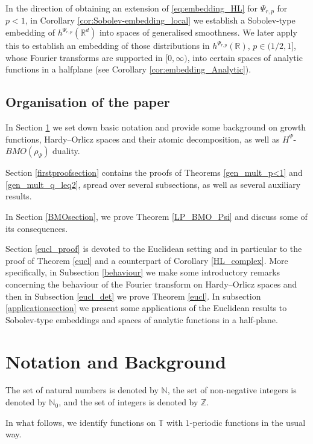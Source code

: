 \documentclass[a4paper, leqno, 10pt]{amsart}
\numberwithin{equation}{section}
\newcommand{\T}{\mathbb{T}}
\newcommand{\R}{\mathbb{R}}
\newcommand{\Z}{\mathbb{Z}}
\newcommand{\N}{\mathbb{N}}
\begin{document}
In the direction of obtaining an extension of \eqref{eq:embedding_HL} for $\Psi_{r,p}$ for $p<1$, in Corollary \ref{cor:Sobolev-embedding_local} we establish a Sobolev-type embedding of $h^{\Psi_{r,p}}(\R^d)$ into spaces of generalised smoothness. We later apply this to establish an embedding of those distributions in $h^{\Psi_{r,p}}(\R)$, $p \in (1/2, 1]$, whose Fourier transforms are supported in $[0,\infty)$, into certain spaces of analytic functions in a halfplane (see Corollary \ref{cor:embedding_Analytic}). 
%

%
\subsection*{Organisation of the paper} 

In Section \ref{background} we set down basic notation and provide some background on growth functions, Hardy--Orlicz spaces and their atomic decomposition, as well as $H^{\Psi}$-$BMO(\rho_{\Psi})$ duality. 

Section \ref{firstproofsection} contains the proofs of Theorems \ref{gen_mult_p<1} and \ref{gen_mult_q_leq2}, spread over several subsections, as well as several auxiliary results.

In Section \ref{BMOsection}, we prove Theorem \ref{LP_BMO_Psi} and discuss some of its consequences.
%

Section \ref{eucl_proof} is devoted to the Euclidean setting and in particular to the proof of Theorem \ref{eucl} and a counterpart of Corollary \ref{HL_complex}. More specifically, in Subsection \ref{behaviour} we make some introductory remarks concerning the behaviour of the Fourier transform on Hardy--Orlicz spaces and then in Subsection \ref{eucl_det} we prove Theorem \ref{eucl}. In subsection \ref{applicationsection} we present some applications of the Euclidean results to Sobolev-type embeddings and spaces of analytic functions in a half-plane. 
 
%

\section{Notation and Background}\label{background}

The set of natural numbers is denoted by $\N$, the set of non-negative integers is denoted by $\N_0$, and the set of integers is denoted by $\Z$. 

%

In what follows, we identify functions on $\T$ with $1$-periodic functions in the usual way.  
\end{document}
